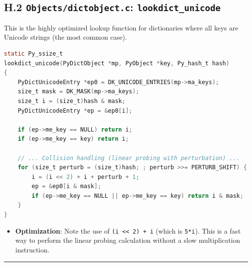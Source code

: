 \hypertarget{h.2-objectsdictobject.c-lookdict_unicode}{%
\subsection{\texorpdfstring{H.2 \texttt{Objects/dictobject.c}:
\texttt{lookdict\_unicode}}{H.2 Objects/dictobject.c: lookdict\_unicode}}\label{h.2-objectsdictobject.c-lookdict_unicode}}

This is the highly optimized lookup function for dictionaries where all
keys are Unicode strings (the most common case).

\begin{lstlisting}[language=C]
static Py_ssize_t
lookdict_unicode(PyDictObject *mp, PyObject *key, Py_hash_t hash)
{
    PyDictUnicodeEntry *ep0 = DK_UNICODE_ENTRIES(mp->ma_keys);
    size_t mask = DK_MASK(mp->ma_keys);
    size_t i = (size_t)hash & mask;
    PyDictUnicodeEntry *ep = &ep0[i];

    if (ep->me_key == NULL) return i;
    if (ep->me_key == key) return i;

    // ... Collision handling (linear probing with perturbation) ...
    for (size_t perturb = (size_t)hash; ; perturb >>= PERTURB_SHIFT) {
        i = (i << 2) + i + perturb + 1;
        ep = &ep0[i & mask];
        if (ep->me_key == NULL || ep->me_key == key) return i & mask;
    }
}
\end{lstlisting}

\begin{itemize}
\tightlist
\item
  \textbf{Optimization}: Note the use of
  \passthrough{\lstinline!(i << 2) + i!} (which is
  \passthrough{\lstinline!5*i!}). This is a fast way to perform the
  linear probing calculation without a slow multiplication instruction.
\end{itemize}

\begin{center}\rule{0.5\linewidth}{0.5pt}\end{center}
